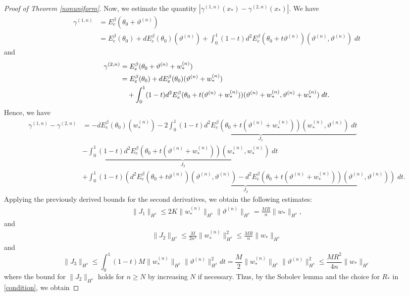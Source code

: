 \documentclass[11pt]{amsart}
\numberwithin{equation}{section}
\begin{document}
\begin{proof}[Proof of Theorem \ref{nonuniform}]
Now, we estimate the quantity $|\gamma^{(1,n)}(x_*)-\gamma^{(2,n)}(x_*)|$. We have 
	\begin{align*}
		\gamma^{(1,n)} &=E_{e}^{\beta}(\theta_0 + \vartheta^{(n)}) \\
		&= E_{e}^{\beta}(\theta_0) + dE_{e}^{\beta}({\theta_0})(\vartheta^{(n)}) + \int_0^1 (1-t) d^2 E_{e}^{\beta}(\theta_0 + t \vartheta^{(n)})(\vartheta^{(n)},\vartheta^{(n)}) \;dt
	\end{align*}
	and 
	\begin{align}
		 \gamma^{(2,n)} &= E_{e}^{\beta}(\theta_0 + \vartheta^{(n)} + w_*^{(n)})\\
        &= E_{e}^{\beta}(\theta_0) + d E_{e}^{\beta}(\theta_0)(\vartheta^{(n)}+w_*^{(n)})\notag \\
		&~~~+ \int_0^1 (1-t) d^2 E_{e}^{\beta}(\theta_0+t(\vartheta^{(n)}+w_*^{(n)}))(\vartheta^{(n)}+w_*^{(n)},\vartheta^{(n)}+w_*^{(n)})\;dt.\notag
	\end{align}
Hence, we have
	\begin{align*}
	 \gamma^{(1,n)}-\gamma^{(2,n)} &= -dE_{e}^{\beta}(\theta_0 )(w_*^{(n)}) 
     - \underbrace{ 2 \int_0^1 (1-t) d^2E_{e}^{\beta}(\theta_0+t(\vartheta^{(n)}+w_*^{(n)}))(w_*^{(n)},\vartheta^{(n)}) \;dt}_{J_1}\\
     &- \underbrace{ \int_0^1 (1-t) d^2E_{e}^{\beta}(\theta_0 + t(\vartheta^{(n)}+w_*^{(n)}))(w_*^{(n)},w_*^{(n)}) \;dt}_{J_2} \\
    & + \underbrace{\int_0^1 (1-t) \left(d^2E_{e}^{\beta}(\theta_0 + t\vartheta^{(n)})(\vartheta^{(n)},\vartheta^{(n)}) - d^2E_{e}^{\beta}(\theta_0 + t(\vartheta^{(n)}+w_*^{(n)}))(\vartheta^{(n)},\vartheta^{(n)})\right) \; dt}_{J_3} .
	\end{align*}
	Applying the previously derived bounds for the second derivatives, we obtain the following estimates:
	\begin{align*}
	\|J_1\|_{H^s} \leq 2K \|w_*^{(n)}\|_{H^s} \|\vartheta^{(n)}\|_{H^s} = \frac{MR}{n} \|w_*\|_{H^s}, 
    \end{align*}
    and
    \begin{align*}
	\|J_2\|_{H^s} \leq \frac{M}{2n^2} \|w_*^{(n)}\|_{H^s}^{2}  \leq \frac{MR}{n} \|w_*\|_{H^s}
	\end{align*}
	and
    \[
	\|J_3\|_{H^s} \le \int_{0}^1(1-t) M \|w_*^{(n)}\|_{H^s} \|\vartheta^{(n)}\|_{H^s}^2 dt=  \frac{M}{2} \|w_*^{(n)}\|_{H^s} \|\vartheta^{(n)}\|_{H^s}^2\le \frac{MR^2}{4n} \|w_*\|_{H^s} 
	\]
	where the bound for $\|J_2\|_{H^s}$ holds for $n \geq N$ by increasing $N$ if necessary. Thus, by the Sobolev lemma and the choice for $R_*$ in \eqref{condition}, we obtain

\end{proof}
\end{document}
